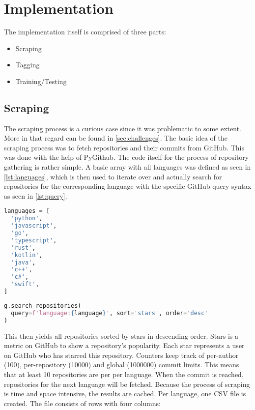 \section{Implementation}
\label{sec:implementation}

The implementation itself is comprised of three parts:

\begin{itemize}
  \item Scraping
  \item Tagging
  \item Training/Testing
\end{itemize}

\subsection{Scraping}

The scraping process is a curious case since it was problematic to some extent.
More in that regard can be found in \autoref{sec:challenges}. The basic idea
of the scraping process was to fetch repositories and their commits from
GitHub. This was done with the help of PyGithub. The code itself for the
process of repository gathering is rather simple. A basic array with all
languages was defined as seen in \autoref{lst:languages}, which is then used to
iterate over and actually search for repositories for the corresponding language
with the specific GitHub query syntax as seen in \autoref{lst:query}.

\begin{lstlisting}[language=python, label={lst:languages}, caption={Array of all languages for scraping}]
languages = [
  'python',
  'javascript',
  'go',
  'typescript',
  'rust',
  'kotlin',
  'java',
  'c++',
  'c#',
  'swift',
]
\end{lstlisting}

\begin{lstlisting}[language=python, label={lst:query}, caption={GitHub query syntax}]
g.search_repositories(
  query=f'language:{language}', sort='stars', order='desc'
)
\end{lstlisting}

This then yields all repositories sorted by stars in descending order.
Stars is a metric on GitHub to show a repository's popularity. Each star
represents a user on GitHub who has starred this repository. Counters keep track of
per-author (100), per-repository (10000) and global (1000000) commit limits.
This means that at least 10 repositories are per per language. When the
 commit is reached, repositories for the next language will
be fetched. Because the process of scraping is time and space intensive, the
results are cached. Per language, one CSV file is created. The file consists of
rows with four columns:

